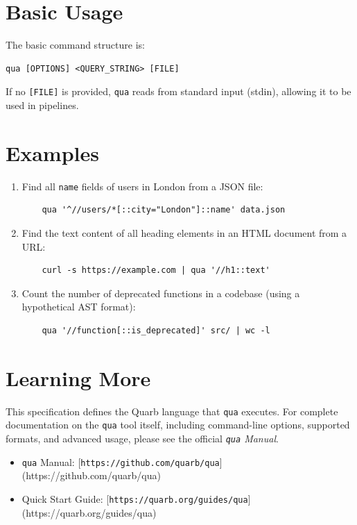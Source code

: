 \section{Basic Usage}

The basic command structure is:
\begin{verbatim}
qua [OPTIONS] <QUERY_STRING> [FILE]
\end{verbatim}
If no \texttt{[FILE]} is provided, \texttt{qua} reads from standard input (stdin), allowing it to be used in pipelines.

\section{Examples}
\begin{enumerate}
	\item Find all \texttt{name} fields of users in London from a JSON file:
	\begin{verbatim}
	qua '^//users/*[::city="London"]::name' data.json
	\end{verbatim}

	\item Find the text content of all heading elements in an HTML document from a URL:
	\begin{verbatim}
    curl -s https://example.com | qua '//h1::text'
	\end{verbatim}

	\item Count the number of deprecated functions in a codebase (using a hypothetical AST format):
	\begin{verbatim}
    qua '//function[::is_deprecated]' src/ | wc -l
	\end{verbatim}
\end{enumerate}

\section{Learning More}

This specification defines the Quarb language that \texttt{qua} executes.
For complete documentation on the \texttt{qua} tool itself,
	including command-line options, supported formats,
	and advanced usage,
	please see the official \emph{\texttt{qua} Manual}.

\begin{itemize}
	\item \texttt{qua} Manual: [\texttt{https://github.com/quarb/qua}](https://github.com/quarb/qua)
	\item Quick Start Guide: [\texttt{https://quarb.org/guides/qua}](https://quarb.org/guides/qua)
\end{itemize}
